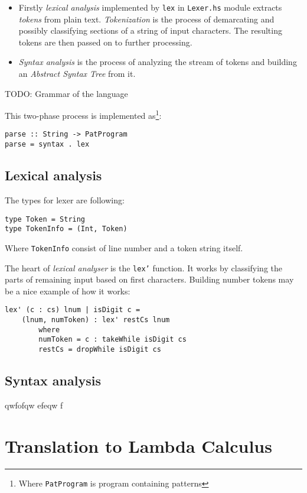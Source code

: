 \documentclass[a4paper]{report}
\begin{document}
\begin{itemize}
  \item Firstly \textit{lexical analysis} implemented by \texttt{lex} in
    \texttt{Lexer.hs} module extracts \textit{tokens} from plain text.
    \textit{Tokenization} is the process of demarcating and possibly
    classifying sections of a string of input characters. The resulting tokens
    are then passed on to further processing.
  \item \textit{Syntax analysis} is the process of analyzing the stream of
    tokens and building an \textit{Abstract Syntax Tree} from it.
\end{itemize}

TODO: Grammar of the language

This two-phase process is implemented as\footnote{Where \texttt{PatProgram}
is program containing patterns}:
\begin{verbatim}
parse :: String -> PatProgram
parse = syntax . lex
\end{verbatim}

\section{Lexical analysis}

The types for lexer are following:
\begin{verbatim}
type Token = String
type TokenInfo = (Int, Token)
\end{verbatim}
Where \texttt{TokenInfo} consist of line number and a token string itself.

The heart of \textit{lexical analyser} is the \texttt{lex'} function. It works
by classifying the parts of remaining input based on first characters.
Building number tokens may be a nice example of how it works:

\begin{lstlisting}[label=lex_comment,caption={Building tokens from numbers.}]
lex' (c : cs) lnum | isDigit c =
    (lnum, numToken) : lex' restCs lnum
        where
        numToken = c : takeWhile isDigit cs
        restCs = dropWhile isDigit cs
\end{lstlisting}


\section{Syntax analysis}
qwfofqw
efeqw
f

\chapter{Translation to Lambda Calculus}
\end{document}

